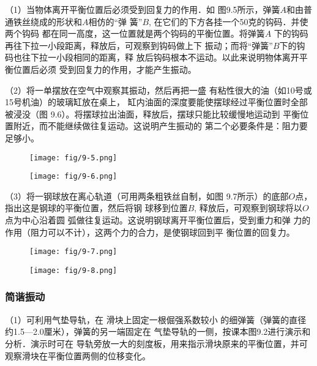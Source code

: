 （1）当物体离开平衡位置后必须受到回复力的作用．如
图9.5所示，弹簧$A$和由普通铁丝绕成的形状和$A$相仿的“弹
簧”$B$, 在它们的下方各挂一个50克的钩码．并使两个钩码
都在同一高度，这一位置就是两个钩码的平衡位置。将弹簧$A$
下的钩码再往下拉一小段距离，释放后，可观察到钩码做上下
振动；而将“弹簧”$B$下的钩码也往下拉一小段相同的距离，释
放后钩码根本不运动。以此来说明物体离开平衡位置后必须
受到回复力的作用，才能产生振动。

（2）将一单摆放在空气中观察其振动，然后再把一盛
有粘性很大的油（如10号或15号机油）的玻璃缸放在桌上，
缸内油面的深度要能使摆球经过平衡位置时全部被浸没（图
9.6）。将摆球拉出油面，释放后，摆球只能比较缓慢地运动到
平衡位置附近，而不能继续做往复运动。这说明产生振动的
第二个必要条件是：阻力要足够小。

\begin{figure}[htp]\centering
    \begin{minipage}[t]{0.48\textwidth}
    \centering
\texttt{[image: fig/9-5.png]}
    \caption{}
    \end{minipage}
    \begin{minipage}[t]{0.48\textwidth}
    \centering
\texttt{[image: fig/9-6.png]}
    \caption{}
    \end{minipage}
    \end{figure}

    （3）将一钢球放在离心轨道（可用两条粗铁丝自制，如图
9.7所示）的底部$O$点，指出这是钢球的平衡位置，然后将钢
球移到位置$B$, 释放后，可观察到钢球将以$O$点为中心沿着圆
弧做往复运动。这说明钢球离开平衡位置后，受到重力和弹
力的作用（阻力可以不计），这两个力的合力，是使钢球回到平
衡位置的回复力。

\begin{figure}[htp]\centering
    \begin{minipage}[t]{0.48\textwidth}
    \centering
\texttt{[image: fig/9-7.png]}
    \caption{}
    \end{minipage}
    \begin{minipage}[t]{0.48\textwidth}
    \centering
\texttt{[image: fig/9-8.png]}
    \caption{}
    \end{minipage}
    \end{figure}

\subsubsection{简谐振动}
（1）可利用气垫导轨，在
滑块上固定一根倔强系数较小
的细弹簧（弹簧的直径约1.5—2.0厘米），弹簧的另一端固定在
气垫导轨的一侧，按课本图9.2进行演示和分析．演示时可在
导轨旁放一大的刻度板，用来指示滑块原来的平衡位置，并可
观察滑块在平衡位置两侧的位移变化。

